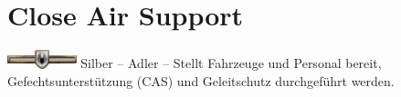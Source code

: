 \section{Close Air Support}
\includegraphics[width=20mm]{../img/truppenordnung/logistikMedevac/silber}\linebreak
Silber -- Adler -- Stellt Fahrzeuge und Personal bereit,  Gefechtsunterstützung (\ac{CAS}) und Geleitschutz durchgeführt werden.